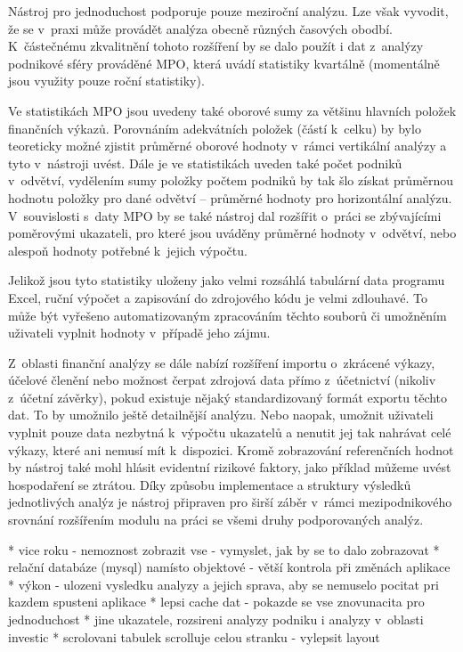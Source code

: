Nástroj pro jednoduchost podporuje pouze meziroční analýzu. Lze však vyvodit, že se v~praxi může provádět analýza obecně různých časových obodbí. K~částečnému zkvalitnění tohoto rozšíření by se dalo použít i dat z~analýzy podnikové sféry prováděné MPO, která uvádí statistiky kvartálně (momentálně jsou využity pouze roční statistiky).

Ve statistikách MPO jsou uvedeny také oborové sumy za většinu hlavních položek finančních výkazů. Porovnáním adekvátních položek (částí k~celku) by bylo teoreticky možné zjistit průměrné oborové hodnoty v~rámci vertikální analýzy a tyto v~nástroji uvést. Dále je ve statistikách uveden také počet podniků v~odvětví, vydělením sumy položky počtem podniků by tak šlo získat průměrnou hodnotu položky pro dané odvětví -- průměrné hodnoty pro horizontální analýzu. V~souvislosti s~daty MPO by se také nástroj dal rozšířit o~práci se zbývajícími poměrovými ukazateli, pro které jsou uváděny průměrné hodnoty v~odvětví, nebo alespoň hodnoty potřebné k~jejich výpočtu.

Jelikož jsou tyto statistiky uloženy jako velmi rozsáhlá tabulární data programu Excel, ruční výpočet a zapisování do zdrojového kódu je velmi zdlouhavé. To může být vyřešeno automatizovaným zpracováním těchto souborů či umožněním uživateli vyplnit hodnoty v~případě jeho zájmu.

Z~oblasti finanční analýzy se dále nabízí rozšíření importu o~zkrácené výkazy, účelové členění nebo možnost čerpat zdrojová data přímo z~účetnictví (nikoliv z~účetní závěrky), pokud existuje nějaký standardizovaný formát exportu těchto dat. To by umožnilo ještě detailnější analýzu. Nebo naopak, umožnit uživateli vyplnit pouze data nezbytná k~výpočtu ukazatelů a nenutit jej tak nahrávat celé výkazy, které ani nemusí mít k~dispozici. Kromě zobrazování referenčních hodnot by nástroj také mohl hlásit evidentní rizikové faktory, jako příklad můžeme uvést hospodaření se ztrátou. Díky způsobu implementace a struktury výsledků jednotlivých analýz je nástroj připraven pro širší záběr v~rámci mezipodnikového srovnání rozšířením modulu na práci se všemi druhy podporovaných analýz.



* vice roku - nemoznost zobrazit vse - vymyslet, jak by se to dalo zobrazovat
* relační databáze (mysql) namísto objektové - větší kontrola při změnách aplikace
* výkon - ulozeni vysledku analyzy a jejich sprava, aby se nemuselo pocitat pri kazdem spusteni aplikace
* lepsi cache dat - pokazde se vse znovunacita pro jednoduchost
* jine ukazatele, rozsireni analyzy podniku i analyzy v~oblasti investic
* scrolovani tabulek scrolluje celou stranku - vylepsit layout

